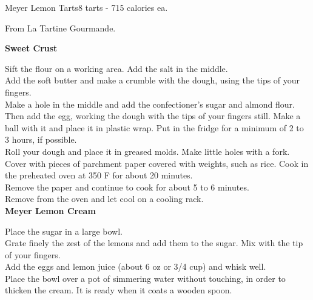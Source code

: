 \begin{recipe}{Meyer Lemon Tarts}{8 tarts - 715 calories ea.}{}

\freeform From La Tartine Gourmande.


\textbf{Sweet Crust}

Sift the flour on a working area. Add the salt in the middle.\\

Add the soft butter and make a crumble with the dough, using the tips of your fingers.\\

Make a hole in the middle and add the confectioner’s sugar and almond flour. Then add the egg, working the dough with the tips of your fingers still. Make a ball with it and place it in plastic wrap. Put in the fridge for a minimum of 2 to 3 hours, if possible.\\

Roll your dough and place it in greased molds. Make little holes with a fork. Cover with pieces of parchment paper covered with weights, such as rice. Cook in the preheated oven at 350 F for about 20 minutes.\\

Remove the paper and continue to cook for about 5 to 6 minutes.\\

Remove from the oven and let cool on a cooling rack.\\

\textbf{Meyer Lemon Cream}

Place the sugar in a large bowl.\\

Grate finely the zest of the lemons and add them to the sugar. Mix with the tip of your fingers.\\

Add the eggs and lemon juice (about 6 oz or 3/4 cup) and whisk well.\\

Place the bowl over a pot of simmering water without touching, in order to thicken the cream. It is ready when it coats a wooden spoon.\newpage


\end{recipe}

